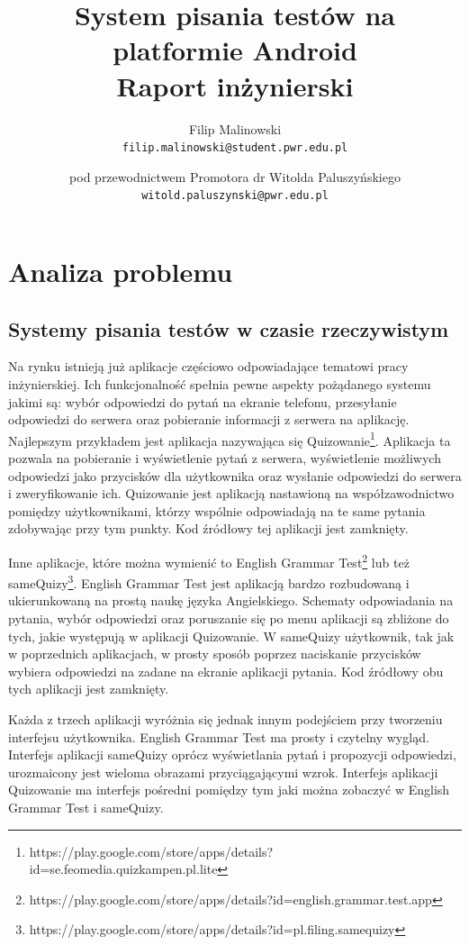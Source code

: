 \documentclass{report}
\title{%
	System pisania testów na platformie Android \\
	\large Raport inżynierski}
\author{
	Filip Malinowski\\
	\texttt{filip.malinowski@student.pwr.edu.pl}
	\and
	pod przewodnictwem Promotora dr Witolda Paluszyńskiego\\
	\texttt{witold.paluszynski@pwr.edu.pl}
}
\date{}
\begin{document}


	
	\chapter{Analiza problemu}
	
		\section{Systemy pisania testów w czasie rzeczywistym}
		Na rynku istnieją już aplikacje częściowo odpowiadające tematowi pracy inżynierskiej. Ich funkcjonalność spełnia pewne aspekty pożądanego systemu jakimi są: wybór odpowiedzi do pytań na ekranie telefonu, przesyłanie odpowiedzi do serwera oraz pobieranie informacji z serwera na aplikację. Najlepszym przykładem jest aplikacja nazywająca się Quizowanie\footnote{https://play.google.com/store/apps/details?id=se.feomedia.quizkampen.pl.lite}. Aplikacja ta pozwala na pobieranie i wyświetlenie pytań z serwera, wyświetlenie możliwych odpowiedzi jako przycisków dla użytkownika oraz wysłanie odpowiedzi do serwera i zweryfikowanie ich. Quizowanie jest aplikacją nastawioną na współzawodnictwo pomiędzy użytkownikami, którzy wspólnie odpowiadają na te same pytania zdobywając przy tym punkty. Kod źródłowy tej aplikacji jest zamknięty.
	
		Inne aplikacje, które można wymienić to English Grammar Test\footnote{https://play.google.com/store/apps/details?id=english.grammar.test.app} lub też sameQuizy\footnote{https://play.google.com/store/apps/details?id=pl.filing.samequizy}. English Grammar Test jest aplikacją bardzo rozbudowaną i ukierunkowaną na prostą naukę języka Angielskiego. Schematy odpowiadania na pytania, wybór odpowiedzi oraz poruszanie się po menu aplikacji są zbliżone do tych, jakie występują w aplikacji Quizowanie. W sameQuizy użytkownik, tak jak w poprzednich aplikacjach, w prosty sposób poprzez naciskanie przycisków wybiera odpowiedzi na zadane na ekranie aplikacji pytania. Kod źródłowy obu tych aplikacji jest zamknięty.
		
		Każda z trzech aplikacji wyróżnia się jednak innym podejściem przy tworzeniu interfejsu użytkownika. English Grammar Test ma prosty i czytelny wygląd. Interfejs aplikacji sameQuizy oprócz wyświetlania pytań i propozycji odpowiedzi, urozmaicony jest wieloma obrazami przyciągającymi wzrok. Interfejs aplikacji Quizowanie ma interfejs pośredni pomiędzy tym jaki można zobaczyć w English Grammar Test i sameQuizy.
		
\end{document}
